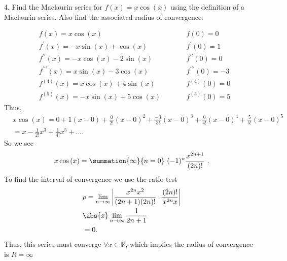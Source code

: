 \documentclass{report}
\begin{document}
    \pagebreak 
    \begin{mdframed}
        4. Find the Maclaurin series for $f(x) = x\cos{(x)}$ using the definition of a Maclaurin series. Also find the associated radius of convergence.
    \end{mdframed}
    \bigbreak \noindent 
    \begin{equation}
    \begin{alignedat}{2}
        &f(x) = x\cos{(x)} \quad \quad &&f(0) = 0 \\
        &f^{\prime}(x) = -x\sin{(x)}+\cos{(x)} \quad \quad &&f^{\prime}(0) = 1 \\
        &f^{\prime\prime}(x) = -x\cos{(x)} -2\sin{(x)} \quad \quad &&f^{\prime\prime}(0) = 0 \\
        &f^{\prime\prime\prime}(x) = x\sin{(x)} -3\cos{(x)} \quad \quad &&f^{\prime\prime\prime}(0) = -3 \\
        &f^{(4)}(x) = x\cos{(x)} + 4\sin{(x)} \quad \quad &&f^{(4)}(0) = 0 \\
        &f^{(5)}(x) = -x\sin{(x)} +5\cos{(x)} \quad \quad &&f^{(5)}(0) = 5
    \end{alignedat}
    \end{equation}
    \bigbreak \noindent 
    Thus,
    \begin{align*}
        &x\cos{(x)} = 0 + 1(x-0) + \frac{0}{2!}(x-0)^{2} + \frac{-3}{3!}(x-0)^{3} + \frac{0}{4!}(x-0)^{4} + \frac{5}{5!}(x-0)^{5} \\
        &=x -\frac{1}{2!}x^{3}+\frac{1}{4!}x^{5} + ...
    .\end{align*}
    So we see
    \begin{align*}
        x\cos{(x)} = \summation{\infty}{n=0}\ (-1)^{n}\frac{x^{2n+1}}{(2n)!}\ 
    .\end{align*}
    \bigbreak \noindent 
    To find the interval of convergence we use the ratio test
    \begin{align*}
        &\rho  = \lim\limits_{n \to \infty}{\bigg\lvert \frac{x^{2n}x^{2}}{(2n+1)(2n)!} \cdot \frac{(2n)!}{x^{2n}x}\bigg\rvert} \\
        &\abs{x} \lim\limits_{n \to \infty}{\frac{1}{2n+1}}\\
        &=0
    .\end{align*}
    \bigbreak \noindent 
    Thus, this series must converge $\forall x\in\mathbb{R}$, which implies the radius of convergence is $R = \infty$
\end{document}
